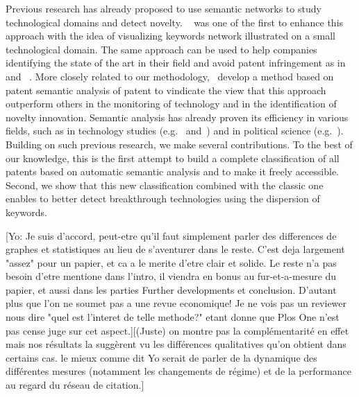 \documentclass[10pt,A4]{article}
\begin{document}
Previous research has already proposed to use semantic networks  to study technological domains and detect novelty. ~\cite{yoon2004text} was one of the first to enhance this approach with the idea of visualizing keywords network illustrated on a small technological domain. The same approach can be used to help companies identifying the state of the art in their field and avoid patent infringement as in ~\cite{park2014semantic} and ~\cite{yoon2011detecting}. More closely related to our methodology,~\cite{gerken2012new} develop a method based on patent semantic analysis of patent to vindicate the view that this approach outperform others in the monitoring of technology and in the identification of novelty innovation. Semantic analysis has already proven its efficiency in various fields, such as in technology studies (e.g.~\cite{choi2014patent} and~\cite{fattori2003text}) and in political science (e.g.~\cite{2015arXiv151003797G}). Building on such previous research, we make several contributions. To the best of our knowledge, this is the first attempt to build a complete classification of all patents based on automatic semantic analysis and to make it freely accessible. Second, we show that this new classification combined with the classic one enables to better detect breakthrough technologies using the dispersion of keywords. 

[Yo: Je suis d'accord, peut-etre qu'il faut simplement parler des differences de graphes et statistiques au lieu de s'aventurer dans le reste. C'est deja largement "assez" pour un papier, et ca a le merite d'etre clair et solide. Le reste n'a pas besoin d'etre mentione dans l'intro, il viendra en bonus au fur-et-a-mesure du papier, et aussi dans les parties Further developments et conclusion. D'autant plus que l'on ne soumet pas a une revue economique! Je ne vois pas un reviewer nous dire "quel est l'interet de telle methode?" etant donne que Plos One n'est pas cense juge sur cet aspect.][(Juste) on montre pas la complémentarité en effet mais nos résultats la suggèrent vu les différences qualitatives qu'on obtient dans certains cas. le mieux comme dit Yo serait de parler de la dynamique des différentes mesures (notamment les changements de régime) et de la performance au regard du réseau de citation.]
\end{document}
